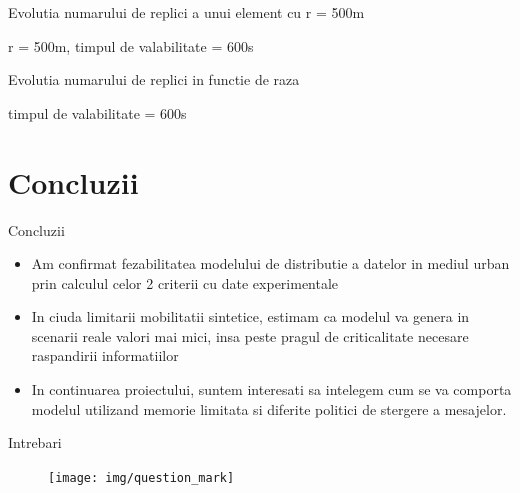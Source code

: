 \documentclass{beamer}
\begin{document}
\begin{frame}{Evolutia numarului de replici a unui element cu r = 500m}
	\begin{figure}[t]
		\centering
		\def\svgwidth{\columnwidth}
		
	\end{figure}
	
	\centerline{r = 500m, timpul de valabilitate = 600s}
\end{frame}
\begin{frame}{Evolutia numarului de replici in functie de raza}
	\begin{figure}[t]
		\centering
		\def\svgwidth{\columnwidth}
		
	\end{figure}
	
	\centerline{timpul de valabilitate = 600s}
\end{frame}

\section{Concluzii}
\begin{frame}{Concluzii}
	\begin{itemize}
	  \item Am confirmat fezabilitatea modelului de distributie a datelor in
	  mediul urban prin calculul celor 2 criterii cu date experimentale
	  \item In ciuda limitarii mobilitatii sintetice, estimam ca modelul va
	  genera in scenarii reale valori mai mici, insa peste pragul de criticalitate
	  necesare raspandirii informatiilor
	  \item In continuarea proiectului, suntem interesati sa intelegem cum se va
	  comporta modelul utilizand memorie limitata si diferite politici de stergere
	  a mesajelor.
	\end{itemize}
\end{frame}
\begin{frame}{Intrebari}
	\begin{figure}
		\centering
		\texttt{[image: img/question\_mark]}
	\end{figure}
\end{frame}
\end{document}
